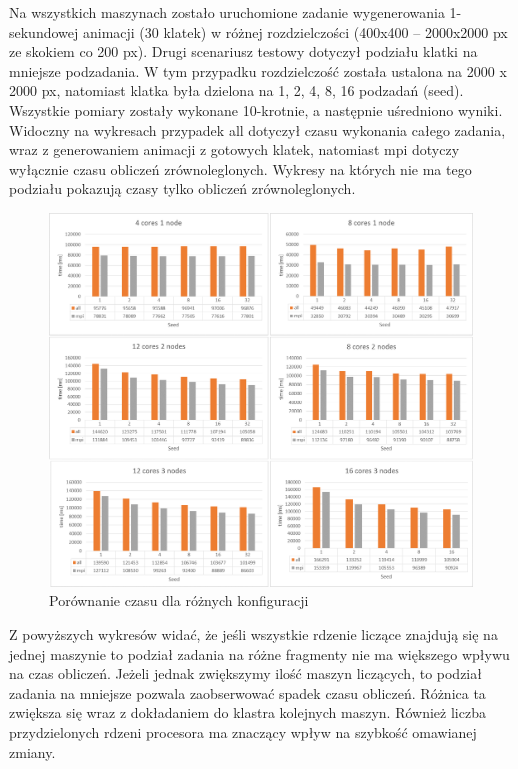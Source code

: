 \documentclass[a4paper]{article}
\begin{document}
Na wszystkich maszynach zostało uruchomione zadanie wygenerowania 1-sekundowej animacji (30 klatek) w różnej rozdzielczości (400x400 – 2000x2000 px ze skokiem co 200 px). Drugi scenariusz testowy dotyczył podziału klatki na mniejsze podzadania. W tym przypadku rozdzielczość została ustalona na 2000 x 2000 px, natomiast klatka była dzielona na 1, 2, 4, 8, 16 podzadań (seed). Wszystkie pomiary zostały wykonane 10-krotnie, a następnie uśredniono wyniki. Widoczny na wykresach przypadek all dotyczył czasu wykonania całego zadania, wraz z generowaniem animacji z gotowych klatek, natomiast mpi dotyczy wyłącznie czasu obliczeń zrównoleglonych. Wykresy na których nie ma tego podziału pokazują czasy tylko obliczeń zrównoleglonych.

\begin{figure}[H]
    \centering
    \includegraphics[width=\textwidth]{1.png}
    \caption{Porównanie czasu dla różnych konfiguracji}
    \label{fig:w1}
\end{figure}

Z powyższych wykresów widać, że jeśli wszystkie rdzenie liczące znajdują się na jednej maszynie to podział zadania na różne fragmenty nie ma większego wpływu na czas obliczeń. Jeżeli jednak zwiększymy ilość maszyn liczących, to podział zadania na mniejsze pozwala zaobserwować spadek czasu obliczeń. Różnica ta zwiększa się wraz z dokładaniem do klastra kolejnych maszyn. Również liczba przydzielonych rdzeni procesora ma znaczący wpływ na szybkość omawianej zmiany.
\end{document}

